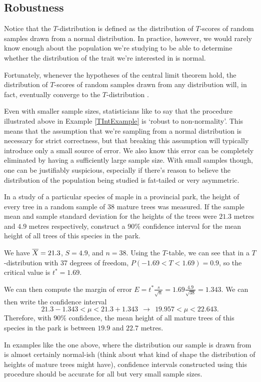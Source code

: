 \subsection*{Robustness}
Notice that the $T$-distribution is defined as the distribution of $T$-scores of random samples drawn from a normal distribution. In practice, however, we would rarely know enough about the population we're studying to be able to determine whether the distribution of the trait we're interested in is normal.
\par
Fortunately, whenever the hypotheses of the central limit theorem hold, the distribution of $T$-scores of random samples drawn from any distribution will, in fact, eventually converge to the $T$-distribution \cite{AsymptoticTDist}. 
\par
Even with smaller sample sizes, statisticians like to say that the procedure illustrated above in Example \ref{TIntExample} is `robust to non-normality'. This means that the assumption that we're sampling from a normal distribution is necessary for strict correctness, but that breaking this assumption will typically introduce only a small source of error. We also know this error can be completely eliminated by having a sufficiently large sample size. With small samples though, one can be justifiably suspicious, especially if there's reason to believe the distribution of the population being studied is fat-tailed or very asymmetric.
\par
\begin{examp}
In a study of a particular species of maple in a provincial park, the height of every tree in a random sample of 38 mature trees was measured. If the sample mean and sample standard deviation for the heights of the trees were $21.3$ metres and $4.9$ metres respectively, construct a $90\%$ confidence interval for the mean height of all trees of this species in the park.
\par
\noindent We have ${\overline{X}} = 21.3$, $S = 4.9$, and $n = 38$. Using the $T$-table, we can see that in a $T$-distribution with 37 degrees of freedom, $P(-1.69 < T < 1.69) = 0.9$, so the critical value is $t^* = 1.69$.
\par
\noindent
We can then compute the margin of error $E = t^* \frac{s}{\sqrt{n}} = 1.69 \frac{4.9}{\sqrt{38}} = 1.343$. We can then write the confidence interval
$$21.3-1.343 < \mu < 21.3+1.343 \ \ \rightarrow \ \ 19.957 < \mu < 22.643.$$
Therefore, with $90\%$ confidence, the mean height of all mature trees of this species in the park is between $19.9$ and $22.7$ metres.
\end{examp}
\par
In examples like the one above, where the distribution our sample is drawn from is almost certainly normal-ish (think about what kind of shape the distribution of heights of mature trees might have), confidence intervals constructed using this procedure should be accurate for all but very small sample sizes.








